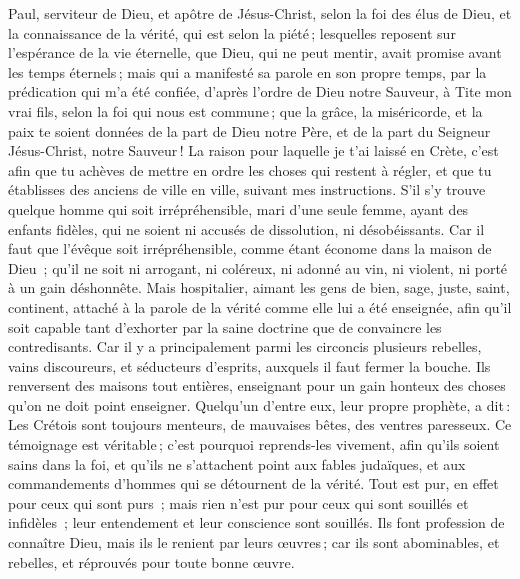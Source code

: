 \BFont
\begin{multicols}{2}
\TextTitle{[Adresse]}
\VerseOne{}Paul, serviteur de Dieu, et apôtre de Jésus-Christ, selon la foi des élus de Dieu, et la connaissance de la vérité, qui est selon la piété ;
lesquelles reposent sur l'espérance de la vie éternelle, que Dieu, qui ne peut mentir, avait promise avant les temps éternels ;
mais qui a manifesté sa parole en son propre temps, par la prédication qui m’a été confiée, d’après l’ordre de Dieu notre Sauveur,
à Tite mon vrai fils, selon la foi qui nous est commune ; que la grâce, la miséricorde, et la paix te soient données de la part de Dieu notre Père, et de la part du Seigneur Jésus-Christ, notre Sauveur !
La raison pour laquelle je t'ai laissé en Crète, c'est afin que tu achèves de mettre en ordre les choses qui restent à régler, et que tu établisses des anciens de ville en ville, suivant mes instructions.
S’il s’y trouve quelque homme qui soit irrépréhensible, mari d'une seule femme, ayant des enfants fidèles, qui ne soient ni accusés de dissolution, ni désobéissants.
Car il faut que l'évêque soit irrépréhensible, comme étant économe dans la maison de Dieu ; qu’il ne soit ni arrogant, ni coléreux, ni adonné au vin, ni violent, ni porté à un gain déshonnête.
Mais hospitalier, aimant les gens de bien, sage, juste, saint, continent,
attaché à la parole de la vérité comme elle lui a été enseignée, afin qu'il soit capable tant d'exhorter par la saine doctrine que de convaincre les contredisants.
Car il y a principalement parmi les circoncis plusieurs rebelles, vains discoureurs, et séducteurs d'esprits,
auxquels il faut fermer la bouche. Ils renversent des maisons tout entières, enseignant pour un gain honteux des choses qu'on ne doit point enseigner.
Quelqu'un d'entre eux, leur propre prophète, a dit : Les Crétois sont toujours menteurs, de mauvaises bêtes, des ventres paresseux.
Ce témoignage est véritable ; c'est pourquoi reprends-les vivement, afin qu'ils soient sains dans la foi,
et qu’ils ne s’attachent point aux fables judaïques, et aux commandements d’hommes qui se détournent de la vérité.
Tout est pur, en effet pour ceux qui sont purs ; mais rien n'est pur pour ceux qui sont souillés et infidèles ; leur entendement et leur conscience sont souillés.
Ils font profession de connaître Dieu, mais ils le renient par leurs œuvres ; car ils sont abominables, et rebelles, et réprouvés pour toute bonne œuvre.

\end{multicols}
